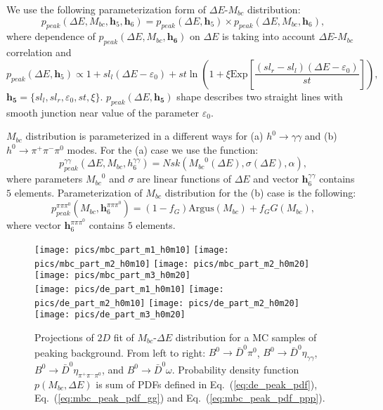 \documentclass[preprint,aps,showpacs]{revtex4}
\newcommand{\bdpi}{\ensuremath{B^0\to \bar D^0\pi^0}\xspace}
\newcommand{\bdetagg}{\ensuremath{B^0\to \bar D^0\eta_{\gamma\gamma}}\xspace}
\newcommand{\bdetappp}{\ensuremath{B^0\to \bar D^0\eta_{\pi^+\pi^-\pi^0}}\xspace}
\newcommand{\bdomega}{\ensuremath{B^0\to \bar D^0\omega}\xspace}
\newcommand{\hgg}{\ensuremath{h^0\to\gamma\gamma}\xspace}
\newcommand{\hppp}{\ensuremath{h^0\to\pi^+\pi^-\pi^0}\xspace}
\newcommand{\de}{\ensuremath{\Delta E}\xspace}
\newcommand{\mbc}{\ensuremath{M_{bc}}\xspace}
\begin{document}
We use the following parameterization form of \de-\mbc distribution:
\begin{equation}
 p_{peak}(\de,\mbc,\mathbf{h}_5,\mathbf{h}_6) = p_{peak}(\de,\mathbf{h}_5)\times p_{peak}(\de,\mbc,\mathbf{h}_6),
\end{equation}
where dependence of $p_{peak}(\de,\mbc,\mathbf{h_6})$ on \de is taking into account \de-\mbc correlation and
\begin{equation}\label{eq:de_peak_pdf}
 p_{peak}(\de,\mathbf{h}_5) \propto 1+sl_l(\Delta E-\varepsilon_0)+st\ln\left(1+\xi\text{Exp}\left[\frac{(sl_r-sl_l)(\Delta E-\varepsilon_0)}{st}\right]\right),
\end{equation}
$\mathbf{h_5} = \{sl_l,sl_r,\varepsilon_0,st,\xi\}$. $p_{peak}(\de,\mathbf{h_5})$ shape describes two straight lines with smooth junction near value of the parameter $\varepsilon_0$.

\mbc distribution is parameterized in a different ways for (a) \hgg and (b) \hppp modes. For the (a) case we use the \verb@Novosibirsk@ function:
\begin{equation}\label{eq:mbc_peak_pdf_gg}
 p^{\gamma\gamma}_{peak}(\de,\mbc,{h}^{\gamma\gamma}_6) = Nsk\left(\mbc^0(\de),\sigma(\de),\alpha\right),
\end{equation}
where parameters $\mbc^0$ and $\sigma$ are linear functions of \de and vector $\mathbf{h}^{\gamma\gamma}_6$ contains $5$ elements. Parameterization of \mbc distribution for the (b) case is the following:
\begin{equation}\label{eq:mbc_peak_pdf_ppp}
 p^{\pi\pi\pi^0}_{peak}(\mbc,\mathbf{h}^{\pi\pi\pi^0}_6) = (1-f_G)\text{Argus}(\mbc)+f_G G(\mbc),
\end{equation}
where vector $\mathbf{h}^{\pi\pi\pi^0}_6$ contains $5$ elements.

\begin{figure}[htb]
 \texttt{[image: pics/mbc\_part\_m1\_h0m10]}
 \texttt{[image: pics/mbc\_part\_m2\_h0m10]}
 \texttt{[image: pics/mbc\_part\_m2\_h0m20]}
 \texttt{[image: pics/mbc\_part\_m3\_h0m20]}\\
 \texttt{[image: pics/de\_part\_m1\_h0m10]}
 \texttt{[image: pics/de\_part\_m2\_h0m10]}
 \texttt{[image: pics/de\_part\_m2\_h0m20]}
 \texttt{[image: pics/de\_part\_m3\_h0m20]}
 \caption{Projections of $2D$ fit of \mbc-\de distribution for a MC samples of peaking background. From left to right: \bdpi, \bdetagg, \bdetappp, and \bdomega. Probability density function $p(\mbc,\de)$ is sum of PDFs defined in Eq.~(\ref{eq:de_peak_pdf}), Eq.~(\ref{eq:mbc_peak_pdf_gg}) and Eq.~(\ref{eq:mbc_peak_pdf_ppp}).}
\label{fig:de-mbc-peak}
\end{figure}
\end{document}
